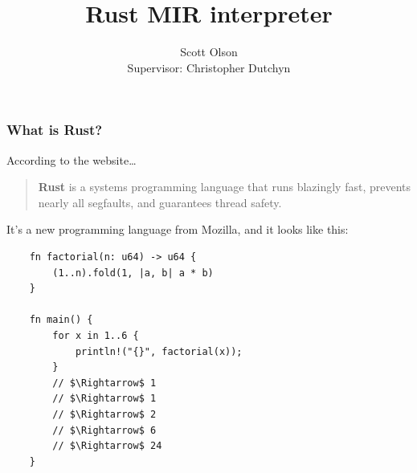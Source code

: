 \documentclass{beamer}
\title{Rust MIR interpreter}
\author{
  Scott Olson
  \texorpdfstring{\\ \scriptsize{Supervisor: Christopher Dutchyn}}{}
}
\institute{
  CMPT 400 \\
  University of Saskatchewan
}
\date{}
\begin{document}
\maketitle

\begin{frame}[fragile]
  \frametitle{What is Rust?}

  According to the website\dots

  \begin{quote}
    \textbf{Rust} is a systems programming language that runs blazingly fast,
    prevents nearly all segfaults, and guarantees thread safety.
  \end{quote}

  It's a new programming language from Mozilla, and it looks like this:

  \begin{verbatim}
    fn factorial(n: u64) -> u64 {
        (1..n).fold(1, |a, b| a * b)
    }

    fn main() {
        for x in 1..6 {
            println!("{}", factorial(x));
        }
        // $\Rightarrow$ 1
        // $\Rightarrow$ 1
        // $\Rightarrow$ 2
        // $\Rightarrow$ 6
        // $\Rightarrow$ 24
    }
  \end{verbatim}
\end{frame}
\end{document}
